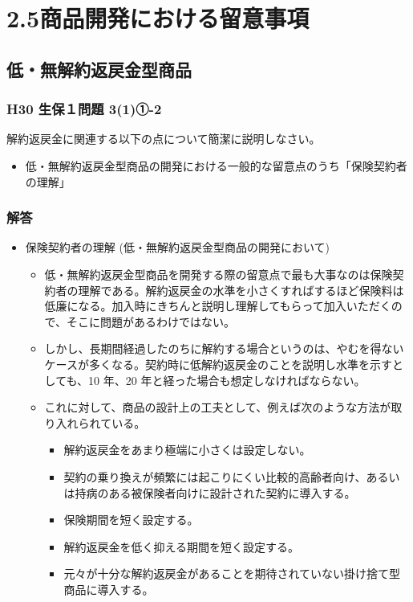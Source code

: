 \documentclass[report,gutter=10mm,fore-edge=10mm,uplatex,dvipdfmx]{jlreq}
\begin{document}
\section{2.5商品開発における留意事項}

\subsection{低・無解約返戻金型商品}

\subsubsection{H30 生保１問題 3(1)①-2}
解約返戻金に関連する以下の点について簡潔に説明しなさい。
\begin{itemize}
\item 低・無解約返戻金型商品の開発における一般的な留意点のうち「保険契約者の理解」
\end{itemize}

\subsubsection{解答}
\begin{itemize}
\item 保険契約者の理解 (低・無解約返戻金型商品の開発において)
  \begin{itemize}
  \item 低・無解約返戻金型商品を開発する際の留意点で最も大事なのは保険契約者の理解である。解約返戻金の水準を小さくすればするほど保険料は低廉になる。加入時にきちんと説明し理解してもらって加入いただくので、そこに問題があるわけではない。
  \item しかし、長期間経過したのちに解約する場合というのは、やむを得ないケースが多くなる。契約時に低解約返戻金のことを説明し水準を示すとしても、10 年、20 年と経った場合も想定しなければならない。
  \item これに対して、商品の設計上の工夫として、例えば次のような方法が取り入れられている。
    \begin{itemize}
    \item 解約返戻金をあまり極端に小さくは設定しない。
    \item 契約の乗り換えが頻繁には起こりにくい比較的高齢者向け、あるいは持病のある被保険者向けに設計された契約に導入する。
    \item 保険期間を短く設定する。
    \item 解約返戻金を低く抑える期間を短く設定する。
    \item 元々が十分な解約返戻金があることを期待されていない掛け捨て型商品に導入する。
    \end{itemize}
  \end{itemize}
\end{itemize}
\end{document}
